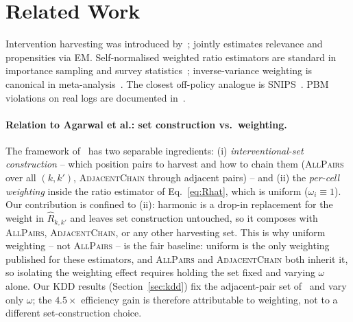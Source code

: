 \documentclass[sigconf]{acmart}
\begin{document}
\section{Related Work}
\label{sec:related}

Intervention harvesting was introduced
by~\cite{agarwal2019estimating}; \cite{wang2018position} jointly
estimates relevance and propensities via EM. Self-normalised weighted
ratio estimators are standard in importance sampling and survey
statistics~\cite{owen2013mc,kong1992ess,hesterberg1995};
inverse-variance weighting is canonical in
meta-analysis~\cite{borenstein2009meta}.
The closest off-policy analogue is
SNIPS~\cite{swaminathan2015snips,bottou2013counterfactual}. PBM
violations on real logs are documented
in~\cite{yue2010beyond,chuklin2015clickmodels}.

\paragraph{Relation to Agarwal et al.: set construction vs.\ weighting.}
The framework of~\cite{agarwal2019estimating} has two separable
ingredients: (i) \emph{interventional-set construction} -- which position
pairs to harvest and how to chain them (\textsc{AllPairs} over all
$(k,k')$, \textsc{AdjacentChain} through adjacent pairs) -- and (ii) the
\emph{per-cell weighting} inside the ratio estimator of
Eq.~\eqref{eq:Rhat}, which is uniform ($\omega_i\equiv 1$). Our
contribution is confined to (ii): harmonic is a drop-in replacement for
the weight in $\hat R_{k,k'}$ and leaves set construction untouched, so it
composes with \textsc{AllPairs}, \textsc{AdjacentChain}, or any other
harvesting set. This is why uniform weighting -- not \textsc{AllPairs} --
is the fair baseline: uniform is the only weighting published for these
estimators, and \textsc{AllPairs} and \textsc{AdjacentChain} both inherit
it, so isolating the weighting effect requires holding the set fixed and
varying $\omega$ alone. Our KDD results (Section~\ref{sec:kdd}) fix the
adjacent-pair set of~\cite{agarwal2019estimating} and vary only $\omega$;
the $4.5\times$ efficiency gain is therefore attributable to weighting, not
to a different set-construction choice.
\end{document}
